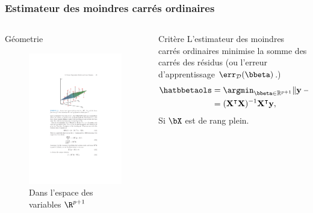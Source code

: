 \documentclass{beamer}\usepackage[]{graphicx}\usepackage[]{color}
\begin{document}
\begin{frame}
  \frametitle{Estimateur des moindres carrés ordinaires}

  \begin{columns}[c]
    \begin{column}{.5\textwidth}
      \begin{block}{Géometrie}
        \begin{figure}[htbp!]
          \centering
          \includegraphics[width=.7\textwidth]{figures/geo_variables}
          \caption{Dans l'espace des variables $\R^{p+1}$}
        \end{figure}
      \end{block}
    \end{column}
    \begin{column}{.5\textwidth}
      \begin{block}{Critère}
        L'estimateur des moindres carrés  ordinaires minimise la somme
        des carrés des résidus (ou l'\alert{erreur d'apprentissage $\err_{\mathcal{D}}(\bbeta)$.})
        \begin{align*}
          \hatbbetaols   & =    \argmin_{\bbeta\in\mathbb{R}^{p+1}}    \|
          \mathbf{y} - \mathbf{X}\bbeta\|_2^2 \\
          & = (\mathbf{X}^\intercal\mathbf{X})^{-1}\mathbf{X}^\intercal\mathbf{y},
        \end{align*}
        Si $\bX$ est de rang plein.
      \end{block}
    \end{column}
  \end{columns}
\end{frame}
\end{document}
